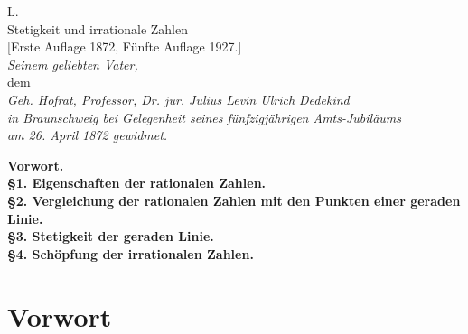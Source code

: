 \documentclass[11pt]{article}
\begin{document}
\begin{center}
{\Large L.}\\[0.4em]
{\LARGE Stetigkeit und irrationale Zahlen}\\[0.6em]
{[Erste Auflage 1872, Fünfte Auflage 1927.]}\\[2em]
{\itshape Seinem geliebten Vater,}\\[0.4em]
{dem}\\[0.4em]
{\itshape Geh. Hofrat, Professor, Dr. jur. Julius Levin Ulrich Dedekind}\\[0.4em]
{\itshape in Braunschweig bei Gelegenheit seines fünfzigjährigen Amts-Jubiläums}\\[0.4em]
{\itshape am 26. April 1872 gewidmet.}
\end{center}

\bigskip

\noindent\textbf{Vorwort.}\\
\textbf{\S 1. Eigenschaften der rationalen Zahlen.}\\
\textbf{\S 2. Vergleichung der rationalen Zahlen mit den Punkten einer geraden Linie.}\\
\textbf{\S 3. Stetigkeit der geraden Linie.}\\
\textbf{\S 4. Schöpfung der irrationalen Zahlen.}

\section*{Vorwort}
\end{document}
